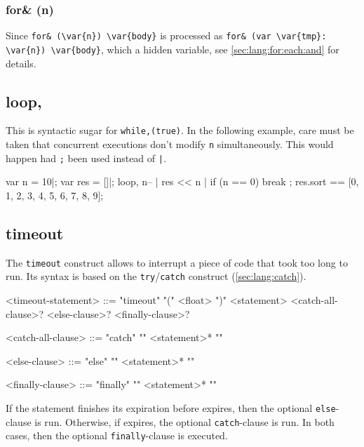 \subsubsection{for\& (n)}

Since \lstinline|for& (\var{n}) \var{body}| is processed as
\lstinline|for& (var \var{tmp}: \var{n}) \var{body}|, which 
a hidden variable, see \autoref{sec:lang:for:each:and} for details.


\subsection{loop,}
\experimentalremoved{}

This is syntactic sugar for \lstinline|while,(true)|.  In the
following example, care must be taken that concurrent executions don't
modify \lstinline|n| simultaneously.  This would happen had
\lstinline|;| been used instead of \lstinline'|'.

\begin{urbiassert}
{
  var n = 10|;
  var res = []|;
  loop,
  {
    n-- |
    res << n |
    if (n == 0)
      break
  };
  res.sort
}
==
[0, 1, 2, 3, 4, 5, 6, 7, 8, 9];
\end{urbiassert}

\subsection{timeout}
\label{sec:lang:timeout}

The \lstinline|timeout| construct allows to interrupt a piece of code that
took too long to run.  Its syntax is based on the
\lstinline|try|/\lstinline|catch| construct (\autoref{sec:lang:catch}).

\begin{bnf}
<timeout-statement>
::= "timeout" "(" <float> ")" <statement> <catch-all-clause>? <else-clause>? <finally-clause>?

<catch-all-clause>
::= "catch" "{" <statement>* "}"

<else-clause>
::= "else" "{" <statement>* "}"

<finally-clause>
::= "finally" "{" <statement>* "}"
\end{bnf}

If the statement finishes its expiration before  expires, then
the optional \lstinline|else|-clause is run.  Otherwise, if 
expires, the optional \lstinline|catch|-clause is run.  In both cases, then
the optional \lstinline|finally|-clause is executed.

